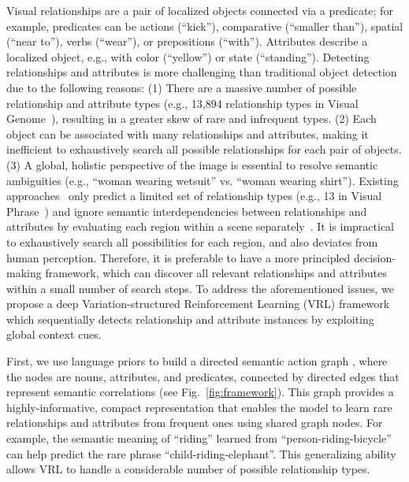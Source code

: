\documentclass[10pt,twocolumn,letterpaper]{article}
\begin{document}
Visual relationships are a pair of localized objects connected via a predicate; for example, predicates can be actions (``kick''), comparative (``smaller than''), spatial (``near to''), verbs (``wear''), or prepositions (``with''). Attributes describe a localized object, e.g., with color (``yellow'') or state (``standing''). Detecting relationships and attributes is more challenging than traditional object detection~\cite{ren2015faster} due to the following reasons: (1) There are a massive {number of} possible relationship and attribute types (e.g., 13,894 relationship types in Visual Genome~\cite{krishna2016visual}), resulting in a greater skew of rare and infrequent types. (2) Each object can be associated with many relationships and attributes, making it inefficient to exhaustively search all { possible relationships} for each pair of objects. (3) A global, {holistic} perspective of the image is essential to resolve semantic {ambiguities} (e.g., ``woman wearing wetsuit'' vs. ``woman wearing shirt''). Existing approaches~\cite{sadeghi2011recognition,johnson2015image, lu2016visual} only predict a limited set of {relationship} types (e.g., 13 in Visual Phrase~\cite{sadeghi2011recognition}) and ignore semantic interdependencies between relationships and attributes by evaluating each region {within a scene separately}~\cite{lu2016visual}. It is impractical to exhaustively search all possibilities for each region, and also deviates from human perception. Therefore, it is preferable to have a more principled decision-making framework, which can discover all relevant relationships and attributes within a small number of search steps. To address the aforementioned issues, we propose a deep Variation-structured Reinforcement Learning (VRL) framework which sequentially detects relationship and attribute instances by exploiting global context cues.

First, we use language priors to build a directed semantic action graph , where the nodes are nouns, attributes, and predicates, connected by directed edges that represent semantic correlations (see Fig.~\ref{fig:framework}). This graph provides a highly-informative, compact representation that enables the model to learn rare relationships and attributes  from frequent ones using shared graph nodes. For example, the semantic meaning of ``riding'' learned from ``person-riding-bicycle'' can help predict the rare phrase ``child-riding-elephant''. This generalizing ability allows VRL to handle a considerable number of possible {relationship} types.
\end{document}
